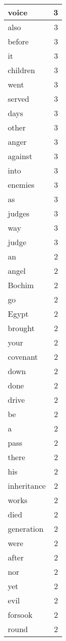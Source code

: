 \begin{center}
\begin{longtable}{l|r}
voice & 3 \\ \hline
also & 3 \\ \hline
before & 3 \\ \hline
it & 3 \\ \hline
children & 3 \\ \hline
went & 3 \\ \hline
served & 3 \\ \hline
days & 3 \\ \hline
other & 3 \\ \hline
anger & 3 \\ \hline
against & 3 \\ \hline
into & 3 \\ \hline
enemies & 3 \\ \hline
as & 3 \\ \hline
judges & 3 \\ \hline
way & 3 \\ \hline
judge & 3 \\ \hline
an & 2 \\ \hline
angel & 2 \\ \hline
Bochim & 2 \\ \hline
go & 2 \\ \hline
Egypt & 2 \\ \hline
brought & 2 \\ \hline
your & 2 \\ \hline
covenant & 2 \\ \hline
down & 2 \\ \hline
done & 2 \\ \hline
drive & 2 \\ \hline
be & 2 \\ \hline
a & 2 \\ \hline
pass & 2 \\ \hline
there & 2 \\ \hline
his & 2 \\ \hline
inheritance & 2 \\ \hline
works & 2 \\ \hline
died & 2 \\ \hline
generation & 2 \\ \hline
were & 2 \\ \hline
after & 2 \\ \hline
nor & 2 \\ \hline
yet & 2 \\ \hline
evil & 2 \\ \hline
forsook & 2 \\ \hline
round & 2 \\ \hline

\end{longtable}
\end{center}

